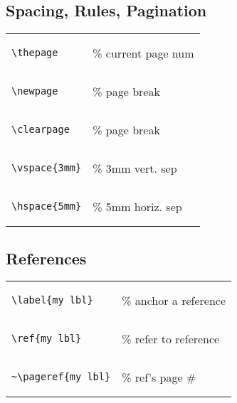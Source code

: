 \subsection*{Spacing, Rules, Pagination}

\begin{tabular}{l l}
\begin{lstlisting}
\thepage
\end{lstlisting}
& \% current page num \\

\begin{lstlisting}
\newpage
\end{lstlisting} 
& \% page break \\

\begin{lstlisting}
\clearpage
\end{lstlisting} 
& \% page break \\

\begin{lstlisting}
\vspace{3mm}
\end{lstlisting}
& \% 3mm vert. sep \\

\begin{lstlisting}
\hspace{5mm}
\end{lstlisting}
& \% 5mm horiz. sep \\

\end{tabular}

\subsection*{References}

\begin{tabular}{l l}
\begin{lstlisting}
\label{my_lbl}
\end{lstlisting}
& \% anchor a reference \\

\begin{lstlisting}
\ref{my_lbl}
\end{lstlisting}
& \% refer to reference \\

\begin{lstlisting}
~\pageref{my_lbl}
\end{lstlisting}
& \% ref's page \# \\



\end{tabular}

